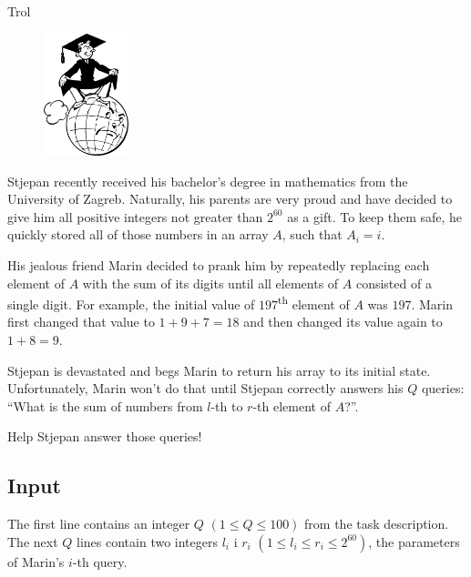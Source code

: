 \begin{statement}[
  problempoints=50,
  timelimit=1 second,
  memorylimit=512 MiB,
]{Trol}

\setlength\intextsep{-0.1cm}
\begin{figure}
\centering
\includegraphics[width=0.22\textwidth]{img/diploma.png}
\end{figure}


Stjepan recently received his bachelor's degree in mathematics from the
University of Zagreb. Naturally, his parents are very proud and have decided
to give him all positive integers not greater than $2^{60}$ as a gift. To keep
them safe, he quickly stored all of those numbers in an array $A$, such that
$A_i = i$.

His jealous friend Marin decided to prank him by repeatedly replacing each
element of $A$ with the sum of its digits until all elements of $A$ consisted
of a single digit. For example, the initial value of $197$\textsuperscript{th}
element of $A$ was $197$. Marin first changed that value to $1 + 9 + 7 = 18$ and
then changed its value again to $1 + 8 = 9$.

Stjepan is devastated and begs Marin to return his array to its initial state.
Unfortunately, Marin won't do that until Stjepan correctly answers his $Q$
queries: ``What is the sum of numbers from $l$-th to $r$-th element of $A$?''.

Help Stjepan answer those queries!

\subsection*{Input}
The first line contains an integer $Q$ $(1 \le Q \le 100)$ from the task
description. \\
The next $Q$ lines contain two integers $l_i$ i $r_i$
$(1 \le l_i \le r_i \le 2^{60})$, the parameters of Marin's $i$-th query.


\end{statement}
